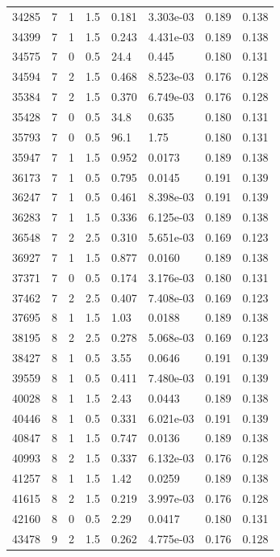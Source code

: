 \documentclass[preview]{standalone}
\begin{document}
{{{\begin{tabular}{L{1.2cm}C{1.2cm} C{0.3cm}C{0.5cm} C{1.4cm}C{1.4cm} C{1.4cm}C{1.4cm}}
  34285  &     7  & 1     & 1.5 &  0.181  & 3.303e-03  & 0.189 &  0.138   \\ 
  34399  &     7  & 1     & 1.5 &  0.243  & 4.431e-03  & 0.189 &  0.138   \\ 
  34575  &     7  & 0     & 0.5 &  24.4  & 0.445  & 0.180 &  0.131   \\ 
  34594  &     7  & 2     & 1.5 &  0.468  & 8.523e-03  & 0.176 &  0.128   \\ 
  35384  &     7  & 2     & 1.5 &  0.370  & 6.749e-03  & 0.176 &  0.128   \\ 
  35428  &     7  & 0     & 0.5 &  34.8  & 0.635  & 0.180 &  0.131   \\ 
  35793  &     7  & 0     & 0.5 &  96.1  & 1.75  & 0.180 &  0.131   \\ 
  35947  &     7  & 1     & 1.5 &  0.952  & 0.0173  & 0.189 &  0.138   \\ 
  36173  &     7  & 1     & 0.5 &  0.795  & 0.0145  & 0.191 &  0.139   \\ 
  36247  &     7  & 1     & 0.5 &  0.461  & 8.398e-03  & 0.191 &  0.139   \\ 
  36283  &     7  & 1     & 1.5 &  0.336  & 6.125e-03  & 0.189 &  0.138   \\ 
  36548  &     7  & 2     & 2.5 &  0.310  & 5.651e-03  & 0.169 &  0.123   \\ 
  36927  &     7  & 1     & 1.5 &  0.877  & 0.0160  & 0.189 &  0.138   \\ 
  37371  &     7  & 0     & 0.5 &  0.174  & 3.176e-03  & 0.180 &  0.131   \\ 
  37462  &     7  & 2     & 2.5 &  0.407  & 7.408e-03  & 0.169 &  0.123   \\ 
  37695  &     8  & 1     & 1.5 &  1.03  & 0.0188  & 0.189 &  0.138   \\ 
  38195  &     8  & 2     & 2.5 &  0.278  & 5.068e-03  & 0.169 &  0.123   \\ 
  38427  &     8  & 1     & 0.5 &  3.55  & 0.0646  & 0.191 &  0.139   \\ 
  39559  &     8  & 1     & 0.5 &  0.411  & 7.480e-03  & 0.191 &  0.139   \\ 
  40028  &     8  & 1     & 1.5 &  2.43  & 0.0443  & 0.189 &  0.138   \\ 
  40446  &     8  & 1     & 0.5 &  0.331  & 6.021e-03  & 0.191 &  0.139   \\ 
  40847  &     8  & 1     & 1.5 &  0.747  & 0.0136  & 0.189 &  0.138   \\ 
  40993  &     8  & 2     & 1.5 &  0.337  & 6.132e-03  & 0.176 &  0.128   \\ 
  41257  &     8  & 1     & 1.5 &  1.42  & 0.0259  & 0.189 &  0.138   \\ 
  41615  &     8  & 2     & 1.5 &  0.219  & 3.997e-03  & 0.176 &  0.128   \\ 
  42160  &     8  & 0     & 0.5 &  2.29  & 0.0417  & 0.180 &  0.131   \\ 
  43478  &     9  & 2     & 1.5 &  0.262  & 4.775e-03  & 0.176 &  0.128   \\ 
\hline 
\end{tabular} 

}}}
\end{document}
